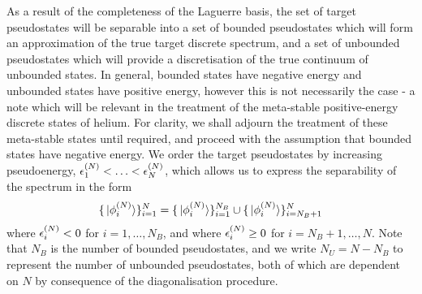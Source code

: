 \documentclass[draft]{article}
\begin{document}
As a result of the completeness of the Laguerre basis, the set of target
pseudostates will be separable into a set of bounded pseudostates which will
form an approximation of the true target discrete spectrum, and a set of
unbounded pseudostates which will provide a discretisation of the true continuum
of unbounded states.
In general, bounded states have negative energy and unbounded states have
positive energy, however this is not necessarily the case - a note which will be
relevant in the treatment of the meta-stable positive-energy discrete states of
helium.
For clarity, we shall adjourn the treatment of these meta-stable states until
required, and proceed with the assumption that bounded states have negative
energy.
We order the target pseudostates by increasing pseudoenergy,
$\epsilon_{1}^{(N)} < \dotsc < \epsilon_{N}^{(N)}$, which allows us to
express the separability of the spectrum in the form
\begin{equation}
  \label{eq:target-spectrum-separable}
  \lbrace\ket*{\phi_{i}^{(N)}}\rbrace_{i = 1}^{N}
  =
  \lbrace\ket*{\phi_{i}^{(N)}}\rbrace_{i = 1}^{N_{B}}
  \cup
  \lbrace\ket*{\phi_{i}^{(N)}}\rbrace_{i = N_{B} + 1}^{N}
\end{equation}
where $\epsilon_{i}^{(N)} < 0$ for $i = 1, \dotsc, N_{B}$, and where
$\epsilon_{i}^{(N)} \geq 0$ for $i = N_{B} + 1, \dotsc, N$.
Note that $N_{B}$ is the number of bounded pseudostates, and we write
$N_{U} = N - N_{B}$ to represent the number of unbounded pseudostates, both of
which are dependent on $N$ by consequence of the diagonalisation procedure.
\end{document}
